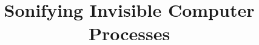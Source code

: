 \documentclass[manuscript,screen]{acmart}
\begin{document}
\title{Sonifying Invisible Computer Processes}







\newcommand{\Pellow}{INSTALLATION }
\newcommand{\Gandini}{FILM DIRECTOR }



\end{document}
